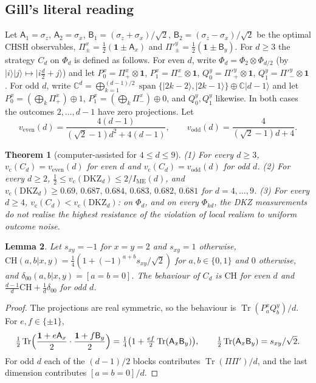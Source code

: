 \documentclass[11pt]{amsart}
\newtheorem{theorem}{Theorem}[section]
\newtheorem{lemma}[theorem]{Lemma}
\theoremstyle{definition}
\theoremstyle{remark}
\numberwithin{equation}{section}
\newcommand{\C}{\mathbb{C}}
\newcommand{\Tr}{\operatorname{Tr}}
\newcommand{\one}{\mathbf{1}}
\newcommand{\IME}{I_{\mathrm{ME}}}
\newcommand{\vc}{v_{\mathrm c}}
\newcommand{\veven}{v_{\mathrm{even}}}
\newcommand{\vodd}{v_{\mathrm{odd}}}
\newcommand{\CH}{\mathrm{CH}}
\newcommand{\DKZ}{\mathrm{DKZ}}
\begin{document}
\subsection{Gill's literal reading}\label{subsec:literal}
Let $\mathsf A_1=\sigma_z$, $\mathsf A_2=\sigma_x$, $\mathsf B_1=(\sigma_z+\sigma_x)/\sqrt2$,
$\mathsf B_2=(\sigma_z-\sigma_x)/\sqrt2$ be the optimal CHSH observables, $\Pi^x_\pm=\frac12(\one\pm\mathsf A_x)$ and
$\Pi'^y_\pm=\frac12(\one\pm\mathsf B_y)$. For $d\ge3$ the strategy $C_d$ on $\Phi_d$ is defined as follows. For even $d$,
write $\Phi_d=\Phi_2\otimes\Phi_{d/2}$ (by $|i\rangle|j\rangle\mapsto|i\frac d2+j\rangle$) and let
$P^x_0=\Pi^x_+\otimes\one$, $P^x_1=\Pi^x_-\otimes\one$, $Q^y_0=\Pi'^y_+\otimes\one$, $Q^y_1=\Pi'^y_-\otimes\one$. For odd
$d$, write $\C^d=\bigoplus_{k=1}^{(d-1)/2}\operatorname{span}\{|2k-2\rangle,|2k-1\rangle\}\oplus\C|d-1\rangle$ and let
$P^x_0=(\bigoplus_k\Pi^x_+)\oplus1$, $P^x_1=(\bigoplus_k\Pi^x_-)\oplus0$, and $Q^y_0,Q^y_1$ likewise. In both cases the
outcomes $2,\dots,d-1$ have zero projections. Let
\[
\veven(d)=\frac{4(d-1)}{(\sqrt2-1)d^2+4(d-1)},\qquad\vodd(d)=\frac4{(\sqrt2-1)d+4}.
\]

\begin{theorem}[computer-assisted for $4\le d\le9$]\label{thm:literal}
(1) For every $d\ge3$, $\vc(C_d)=\veven(d)$ for even $d$ and $\vc(C_d)=\vodd(d)$ for odd $d$. (2) For every $d\ge2$,
$\frac12\le\vc(\DKZ_d)\le2/\IME(d)$, and $\vc(\DKZ_d)\ge0.69,\,0.687,\,0.684,\,0.683,\,0.682,\,0.681$ for $d=4,\dots,9$.
(3) For every $d\ge4$, $\vc(C_d)<\vc(\DKZ_d)$: on $\Phi_d$, and on every $\Phi_{kd}$, the DKZ measurements do not
realise the highest resistance of the violation of local realism to uniform outcome noise.
\end{theorem}

\begin{lemma}\label{lem:Cbeh}
Let $s_{xy}=-1$ for $x=y=2$ and $s_{xy}=1$ otherwise, $\CH(a,b|x,y)=\frac14(1+(-1)^{a+b}s_{xy}/\sqrt2)$ for
$a,b\in\{0,1\}$ and $0$ otherwise, and $\delta_{00}(a,b|x,y)=[a=b=0]$. The behaviour of $C_d$ is $\CH$ for even $d$ and
$\frac{d-1}d\CH+\frac1d\delta_{00}$ for odd $d$.
\end{lemma}

\begin{proof}
The projections are real symmetric, so the behaviour is $\Tr(P^x_aQ^y_b)/d$. For $e,f\in\{\pm1\}$,
\[
\tfrac12\Tr\Bigl(\frac{\one+e\mathsf A_x}2\cdot\frac{\one+f\mathsf B_y}2\Bigr)=\tfrac14\bigl(1+\tfrac{ef}2\Tr(\mathsf A_x\mathsf B_y)\bigr),
\qquad\tfrac12\Tr(\mathsf A_x\mathsf B_y)=s_{xy}/\sqrt2 .
\]
For odd $d$ each of the $(d-1)/2$ blocks contributes $\Tr(\Pi\Pi')/d$, and the last dimension contributes $[a=b=0]/d$.
\end{proof}
\end{document}
